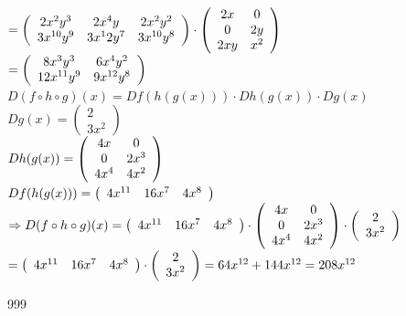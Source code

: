 \documentclass[a4paper]{article}
\begin{document}
$ = \left(\begin{array}{c c c} 2x^2y^3 & 2x^4y & 2x^2y^2 \\ 3x^{10}y^9 & 3x^12y^7 & 3x^{10}y^8 \end{array}\right) 
\cdot \left(\begin{array}{c c} 2x & 0 \\ 0 & 2y \\ 2xy & x^2 \end{array} \right) $\\

$ = \left(\begin{array}{c c} 8x^3y^3 & 6x^4y^2 \\ 12x^{11}y^9 & 9x^{12}y^8 \end{array}\right) $\\

$ D(f \circ h \circ g)(x) = Df(h(g(x))) \cdot Dh(g(x)) \cdot Dg(x) $\\

$ Dg(x) = \left(\begin{array}{c} 2 \\ 3x^2 \end{array}\right) $\\

$ Dh(g(x)) =  \left(\begin{array}{c c} 4x & 0 \\ 0 & 2x^3 \\ 4x^4 & 4x^2 \end{array} \right) $\\

$ Df(h(g(x))) = \left(\begin{array}{c c c} 4x^{11} & 16x^7 & 4x^8 \end{array}\right) $\\

$ \Rightarrow D(f \circ h \circ g)(x) = \left(\begin{array}{c c c} 4x^{11} & 16x^7 & 4x^8 \end{array}\right)
\cdot \left(\begin{array}{c c} 4x & 0 \\ 0 & 2x^3 \\ 4x^4 & 4x^2 \end{array} \right) \cdot \left(\begin{array}{c} 2 \\ 3x^2 \end{array}\right) $\\

$ = \left(\begin{array}{c c c} 4x^{11} & 16x^7 & 4x^8 \end{array}\right) \cdot \left(\begin{array}{c} 2 \\ 3x^2 \end{array}\right) 
= 64x^{12} + 144x^{12} = 208x^{12} $\\

\begin{thebibliography}{999}
\end{thebibliography}
\end{document}
